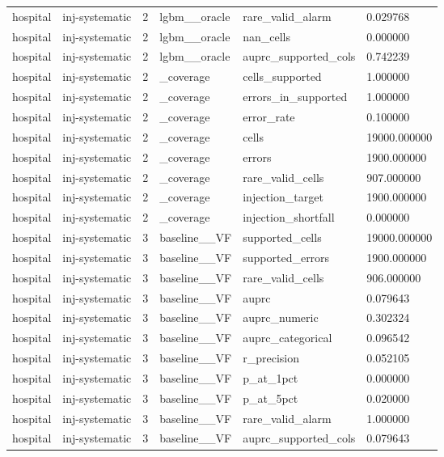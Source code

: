 \begin{tabular}{llllll}
hospital & inj-systematic & 2 & lgbm\_\_oracle & rare\_valid\_alarm & 0.029768 \\
hospital & inj-systematic & 2 & lgbm\_\_oracle & nan\_cells & 0.000000 \\
hospital & inj-systematic & 2 & lgbm\_\_oracle & auprc\_supported\_cols & 0.742239 \\
hospital & inj-systematic & 2 & \_coverage & cells\_supported & 1.000000 \\
hospital & inj-systematic & 2 & \_coverage & errors\_in\_supported & 1.000000 \\
hospital & inj-systematic & 2 & \_coverage & error\_rate & 0.100000 \\
hospital & inj-systematic & 2 & \_coverage & cells & 19000.000000 \\
hospital & inj-systematic & 2 & \_coverage & errors & 1900.000000 \\
hospital & inj-systematic & 2 & \_coverage & rare\_valid\_cells & 907.000000 \\
hospital & inj-systematic & 2 & \_coverage & injection\_target & 1900.000000 \\
hospital & inj-systematic & 2 & \_coverage & injection\_shortfall & 0.000000 \\
hospital & inj-systematic & 3 & baseline\_\_VF & supported\_cells & 19000.000000 \\
hospital & inj-systematic & 3 & baseline\_\_VF & supported\_errors & 1900.000000 \\
hospital & inj-systematic & 3 & baseline\_\_VF & rare\_valid\_cells & 906.000000 \\
hospital & inj-systematic & 3 & baseline\_\_VF & auprc & 0.079643 \\
hospital & inj-systematic & 3 & baseline\_\_VF & auprc\_numeric & 0.302324 \\
hospital & inj-systematic & 3 & baseline\_\_VF & auprc\_categorical & 0.096542 \\
hospital & inj-systematic & 3 & baseline\_\_VF & r\_precision & 0.052105 \\
hospital & inj-systematic & 3 & baseline\_\_VF & p\_at\_1pct & 0.000000 \\
hospital & inj-systematic & 3 & baseline\_\_VF & p\_at\_5pct & 0.020000 \\
hospital & inj-systematic & 3 & baseline\_\_VF & rare\_valid\_alarm & 1.000000 \\
hospital & inj-systematic & 3 & baseline\_\_VF & auprc\_supported\_cols & 0.079643 \\

\end{tabular}
